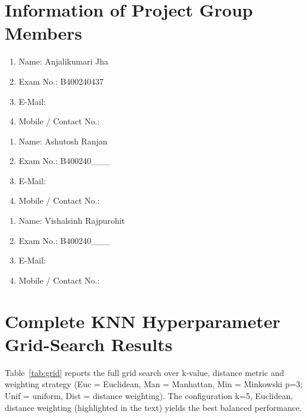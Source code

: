 \documentclass[oneside,a4paper,12pt]{report}
\begin{document}
\begin{appendices}
\chapter{Information of Project Group Members}
\begin{enumerate}
\item Name: Anjalikumari Jha \hspace{60 mm}
\item Exam No.: B400240437
\item E-Mail:
\item Mobile / Contact No.:
\end{enumerate}
\vspace*{1\baselineskip}
\begin{enumerate}
\item Name: Ashutosh Ranjan \hspace{63 mm}
\item Exam No.: B400240\_\_\_
\item E-Mail:
\item Mobile / Contact No.:
\end{enumerate}
\vspace*{1\baselineskip}
\begin{enumerate}
\item Name: Vishalsinh Rajpurohit \hspace{52 mm}
\item Exam No.: B400240\_\_\_
\item E-Mail:
\item Mobile / Contact No.:
\end{enumerate}

\chapter{Complete KNN Hyperparameter Grid-Search Results}
Table~\ref{tab:grid} reports the full grid search over k-value, distance metric and
weighting strategy (Euc = Euclidean, Man = Manhattan, Min = Minkowski p=3;
Unif = uniform, Dist = distance weighting). The configuration k=5, Euclidean,
distance weighting (highlighted in the text) yields the best balanced performance.


\end{appendices}
\end{document}

